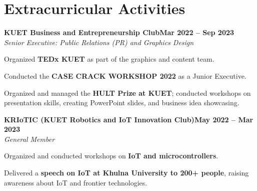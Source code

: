 \documentclass[letterpaper,10pt]{article}
\newcommand{\heading}[2]{
  \hspace{10pt}#1\hfill#2\\
}
\newcommand{\headingBf}[2]{
  \heading{\textbf{#1}}{\textbf{#2}}
}
\newcommand{\headingIt}[2]{
  \heading{\textit{#1}}{\textit{#2}}
}
\newenvironment{resume_list}{
  \vspace{-7pt}
  \begin{itemize}[itemsep=-2px, parsep=1pt, leftmargin=30pt]
}{
  \end{itemize}
}
\begin{document}

 \section{Extracurricular Activities}

  
  \headingBf{KUET Business and Entrepreneurship Club}{Mar 2022 -- Sep 2023}
  \headingIt{Senior Executive: Public Relations (PR) and Graphics Design}{}
  \begin{resume_list}
    \item Organized \textbf{TEDx KUET} as part of the graphics and content team.
    \item Conducted the \textbf{CASE CRACK WORKSHOP 2022} as a Junior Executive.
    \item Organized and managed the \textbf{HULT Prize at KUET}; conducted workshops on presentation skills, creating PowerPoint slides, and business idea showcasing.
  \end{resume_list}



  \headingBf{KRIoTIC (KUET Robotics and IoT Innovation Club)}{May 2022 -- Mar 2023}
  \headingIt{General Member}{}
  \begin{resume_list}
    \item Organized and conducted workshops on \textbf{IoT and microcontrollers}.
    \item Delivered a \textbf{speech on IoT at Khulna University to 200+ people}, raising awareness about IoT and frontier technologies.
  \end{resume_list}




  
\end{document}
